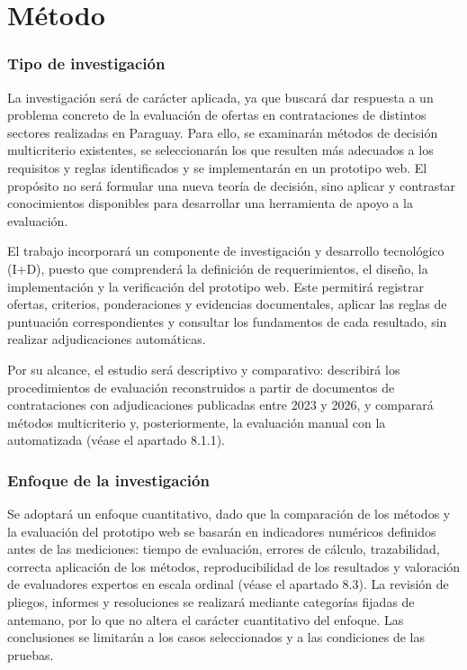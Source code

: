 \documentclass[12pt,a4paper]{article}
\begin{document}
\section{Método}

\subsubsection*{Tipo de investigación}

La investigación será de carácter aplicada, ya que buscará dar respuesta a un problema concreto de la evaluación de ofertas en contrataciones de distintos sectores realizadas en Paraguay. Para ello, se examinarán métodos de decisión multicriterio existentes, se seleccionarán los que resulten más adecuados a los requisitos y reglas identificados y se implementarán en un prototipo web. El propósito no será formular una nueva teoría de decisión, sino aplicar y contrastar conocimientos disponibles para desarrollar una herramienta de apoyo a la evaluación.

El trabajo incorporará un componente de investigación y desarrollo tecnológico (I+D), puesto que comprenderá la definición de requerimientos, el diseño, la implementación y la verificación del prototipo web. Este permitirá registrar ofertas, criterios, ponderaciones y evidencias documentales, aplicar las reglas de puntuación correspondientes y consultar los fundamentos de cada resultado, sin realizar adjudicaciones automáticas.


Por su alcance, el estudio será descriptivo y comparativo: describirá los procedimientos de evaluación reconstruidos a partir de documentos de contrataciones con adjudicaciones publicadas entre 2023 y 2026, y comparará métodos multicriterio y, posteriormente, la evaluación manual con la automatizada (véase el apartado 8.1.1).

\subsubsection*{Enfoque de la investigación}


Se adoptará un enfoque cuantitativo, dado que la comparación de los métodos y la evaluación del prototipo web se basarán en indicadores numéricos definidos antes de las mediciones: tiempo de evaluación, errores de cálculo, trazabilidad, correcta aplicación de los métodos, reproducibilidad de los resultados y valoración de evaluadores expertos en escala ordinal (véase el apartado 8.3). La revisión de pliegos, informes y resoluciones se realizará mediante categorías fijadas de antemano, por lo que no altera el carácter cuantitativo del enfoque. Las conclusiones se limitarán a los casos seleccionados y a las condiciones de las pruebas.
\end{document}
